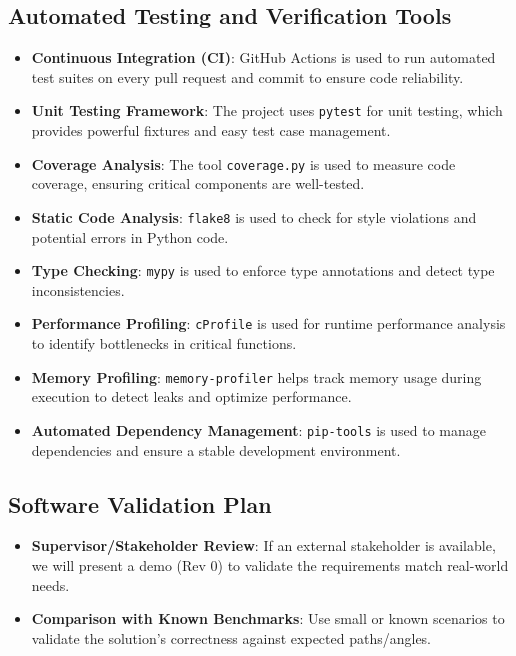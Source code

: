 \documentclass[12pt, titlepage]{article}
\begin{document}
\subsection{Automated Testing and Verification Tools}

\begin{itemize}
  \item \textbf{Continuous Integration (CI)}: GitHub Actions is used to run automated test suites on every pull request and commit to ensure code reliability.
  \item \textbf{Unit Testing Framework}: The project uses \texttt{pytest} for unit testing, which provides powerful fixtures and easy test case management.
  \item \textbf{Coverage Analysis}: The tool \texttt{coverage.py} is used to measure code coverage, ensuring critical components are well-tested.
  \item \textbf{Static Code Analysis}: \texttt{flake8} is used to check for style violations and potential errors in Python code.
  \item \textbf{Type Checking}: \texttt{mypy} is used to enforce type annotations and detect type inconsistencies.
  \item \textbf{Performance Profiling}: \texttt{cProfile} is used for runtime performance analysis to identify bottlenecks in critical functions.
  \item \textbf{Memory Profiling}: \texttt{memory-profiler} helps track memory usage during execution to detect leaks and optimize performance.
  \item \textbf{Automated Dependency Management}: \texttt{pip-tools} is used to manage dependencies and ensure a stable development environment.
\end{itemize}



\subsection{Software Validation Plan}

\begin{itemize}
  \item \textbf{Supervisor/Stakeholder Review}: If an external stakeholder is available, we will present a demo (Rev 0) to validate the requirements match real-world needs.
  \item \textbf{Comparison with Known Benchmarks}: Use small or known scenarios to validate the solution’s correctness against expected paths/angles.
\end{itemize}
\end{document}
